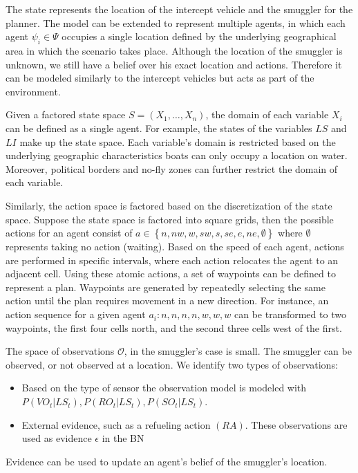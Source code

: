 \documentclass[conference]{IEEEtran}
\begin{document}
The state represents the location of the intercept vehicle and the smuggler for the planner. The model can be extended to represent multiple agents, in which each agent $\psi_i\in\Psi$ occupies a single location defined by the underlying geographical area in which the scenario takes place. Although the location of the smuggler is unknown, we still have a belief over his exact location and actions. Therefore it can be modeled similarly to the intercept vehicles but acts as part of the environment.

Given a factored state space $S = \left(X_1, \ldots, X_n\right)$, the domain of each variable $X_i$ can be defined as a single agent. For example, the states of the variables $LS$ and $LI$ make up the state space. Each variable's domain is restricted based on the underlying geographic characteristics \ie boats can only occupy a location on water. Moreover, political borders and no-fly zones can further restrict the domain of each variable.

Similarly, the action space is factored based on the discretization of the state space. Suppose the state space is factored into square grids, then the possible actions for an agent consist of $a\in\left\{n, nw, w, sw, s, se, e, ne, \emptyset \right\}$ where $\emptyset$ represents taking no action (\ie waiting). Based on the speed of each agent, actions are performed in specific intervals, where each action relocates the agent to an adjacent cell. Using these atomic actions, a set of waypoints can be defined to represent a plan. Waypoints are generated by repeatedly selecting the same action until the plan requires movement in a new direction. For instance, an action sequence for a given agent $a_i: n, n, n, n, w, w, w$ can be transformed to two waypoints, the first four cells north, and the second three cells west of the first.

The space of observations $\mathcal{O}$, in the smuggler's case is small. The smuggler can be observed, or not observed at a location. We identify two types of observations:
\begin{itemize}
\item Based on the type of sensor the observation model is modeled with $P(VO_t|LS_t), P(RO_t|LS_t), P(SO_t|LS_t)$.
\item External evidence, such as a refueling action $(RA)$. These observations are used as evidence $\epsilon$ in the BN
\end{itemize}
Evidence can be used to update an agent's belief of the smuggler's location.
\end{document}
